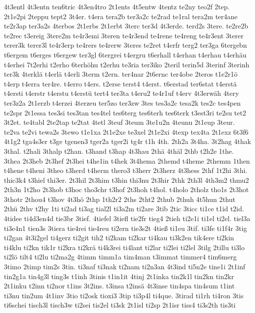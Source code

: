 {4t3entl
4t3entn
ten6tric
4t3en4tro
2t1ents
4t5entw
4tentz
te2ny
teo2f
2tep.
2t1e2pi
2teppu
tept2
3t4er.
t4era
tera2b
ter3a2c
te2rad
te1ral
tera2m
ter4ane
te2r3ap
ter3a2s
4terbos
2t1erbs
2t1erbt
3terc
ter3d
4t3erde.
terd2s
3tere.
te2re2b
te2rec
t3ereig
3tere2m
te4r3emi
3teren
te4r3end
te4rene
te4reng
te4r3ent
3terer
terer3k
terer3l
te4r3erp
te4rers
te4rerw
3teres
te2ret
t4erfr
terg2
ter3ga
6tergebn
t6ergem
t6erges
t6ergew
ter3gl
6tergrei
t4ergru
t6erhall
t4erhan
t4erhau
t4erhäu
t4erhei
7t2erhi
t2erho
6terhöhu
t2erhu
te3ria
ter3iko
2teril
terin5d
3terinf
3terinh
ter3k
4terklä
t4erlä
t4erli
3term
t2ern.
ter4nar
2t6ernc
ter4obe
2teros
t1e2r1ö
t4erp
t4erra
ter4re.
t4erro
t4ers.
t2erse
terst4
t4erst.
t6erstad
ter6stat
t4erstä
t4ersti
t4erstr
t4erstu
t4erstü
tert4
ter3ta
t4eru2
te4r1uf
t4erv
4t3erwäh
4tery
ter3z2a
2t1erzb
t4erzei
4terzeu
ter5zo
ter3zw
3tes
tes3a2c
tesa2k
tes2c
tes4pen
te2spr
2t1essa
tes3si
tes3tan
tes4tel
tes6terg
tes6terh
tes6terk
t3est3ri
te2su
tet2
3t2et.
te4tabl
2te2tap
te2tat
4tetl
3teuf
3teum
3te1u2n
4teunu
2t1eup
3teur.
te2va
te2vi
tewa2s
3tewo
t1e1xa
2t1e2xe
te3xel
2t1e2xi
4texp
tex4ta
2t1exz
6t3f6
4t1g2
tga4s3er
t3ge
tgenen3
tger2a
tger2i
tg4r
t1h
4th.
2th2a
3t4ha.
3t2hag
4thak
3thal.
t2hali
3thalp
t2han.
t3hand
t3hap
4t3hau
2thä
4thäl
2thb
t2h2e
1the.
3thea
2t3heb
2t3hef
2t3hei
t4he1in
t4hek
3t4hema
2themd
t4heme
2themm
1then
t4hene
t4heni
3theo
t3herd
t4herm
thero3
t3herr
2t3herz
4t3hess
2thf
1t2hi
3thi.
thic3k4
t3hiel
thi3er.
2t3hil
2t3him
t3hin
thi3nu
2t3hir
2thk
2th3l
4th3m2
thmu2
2th3n
1t2ho
2t3hob
t3hoc
tho3chr
t3hof
2t3hoh
t4hol.
t4holo
2tholz
tho1s
2t3hot
3thotr
2thou4
t3hov
4t3hö
2thp
1th2r2
2ths
2tht2
2thub
2thuh
4t5hun
2thut
2thü
2thv
t2hy
1ti
ti2ad
ti3ag
tial2l
ti3a2m
ti2are
3tib
2tic
3ticc
ti1ce
t1id
t2id.
4tidee
ti4d3en4d
tie3br
3tief.
4tiefel
3tiefl
tie2fr
tieg4
2tieh
ti2e1i
ti1el
ti2el.
tiel3a
ti3e4n1
tien3s
3tiera
tie4rei
tie4reu
ti2ern
tie3s2t
4tieß
ti1eu
3tif.
ti3fe
ti1f4r
3tig
ti2gan
4t3i2gel
ti4gerz
ti2git
tih2
ti2kam
ti2kar
ti4kau
ti3k2en
tik4ere
ti2kin
ti4klu
ti2kn
tik1r
ti2kra
ti2krä
ti4k3rei
ti4lant
ti2lar
ti2lei
ti2lel
3tilg
2tillu
ti3lo
ti2lö
tilt4
ti2lu
ti2ma2g
4timm
timm1a
tim4man
t3immat
timmer4
tim6merg
3timo
2timp
tim2s
3tin.
ti3naf
ti3nak
ti2nam
ti2n3an
4t3ind
ti5n2e
tine1i
2t1inf
tin2g1a
tin4g3l
ting3s
t1inh
3tinis
t1in1it
4tinj
2t1inka
tin2k1l
tin2kn
tin2kr
2t1inku
t2inn
ti2nor
t1ins
3t2ins.
t3insa
t2insä
4t3inse
tin4spa
tin4sum
t1int
ti3nu
tin2um
4t1inv
3tio
ti2osk
tioxi3
3tip
ti3p4l
ti4que.
3tirad
ti1rh
ti4ron
3tis
ti6schei
tisch3l
tisch3w
ti2sei
tis2el
ti3sk
2t1isl
ti2sp
2t1isr
tiss4
ti3s2th
tis3ti
}
